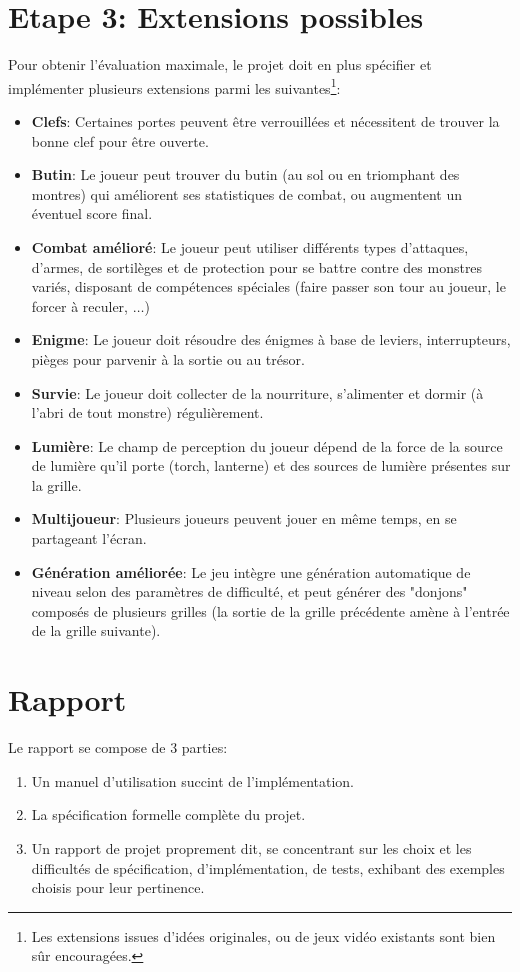 \documentclass{article}
\begin{document}
\section*{Etape 3: Extensions possibles}

Pour obtenir l'évaluation maximale, le projet doit en plus spécifier
et implémenter plusieurs extensions parmi les suivantes\footnote{Les
  extensions issues d'idées originales, ou de jeux vidéo existants
  sont bien sûr encouragées.}:
\begin{itemize}
\item \textbf{Clefs}: Certaines portes peuvent être verrouillées et
  nécessitent de trouver la bonne clef pour être ouverte.
\item \textbf{Butin}: Le joueur peut trouver du butin (au sol ou en
  triomphant des montres) qui améliorent ses statistiques de combat, ou
  augmentent un éventuel score final.
\item \textbf{Combat amélioré}: Le joueur peut utiliser différents
  types d'attaques, d'armes, de sortilèges et de protection pour se
  battre contre des monstres variés, disposant de compétences
  spéciales (faire passer son tour au joueur, le forcer à reculer,
  $\dots$)
\item \textbf{Enigme}: Le joueur doit résoudre des énigmes à base de
  leviers, interrupteurs, pièges pour parvenir à la sortie ou au trésor.
\item \textbf{Survie}: Le joueur doit collecter de la nourriture,
  s'alimenter et dormir (à l'abri de tout monstre) régulièrement.
\item \textbf{Lumière}: Le champ de perception du joueur dépend de la
  force de la source de lumière qu'il porte (torch, lanterne) et des
  sources de lumière présentes sur la grille.
\item \textbf{Multijoueur}: Plusieurs joueurs peuvent jouer en même
  temps, en se partageant l'écran.
\item \textbf{Génération améliorée}: Le jeu intègre une génération
  automatique de niveau selon des paramètres de difficulté, et peut
  générer des "donjons" composés de plusieurs grilles (la sortie de la
  grille précédente amène à l'entrée de la grille suivante).
\end{itemize}

\section*{Rapport}

Le rapport se compose de 3 parties:
\begin{enumerate}
\item Un manuel d'utilisation succint de l'implémentation.
\item La spécification formelle complète du projet.
\item Un rapport de projet proprement dit, se concentrant sur les
  choix et les difficultés de spécification, d'implémentation, de
  tests, exhibant des exemples choisis pour leur pertinence.
\end{enumerate}
\end{document}
